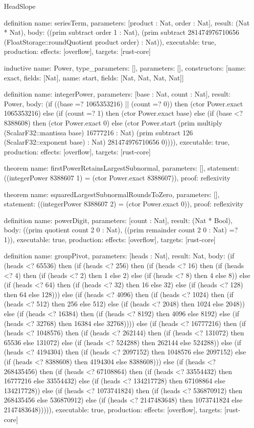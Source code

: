 \begin{lexlean}{HeadSlope}
\begin{semanticmodule}
definition{
  name: seriesTerm,
  parameters: [product : Nat, order : Nat],
  result: (Nat * Nat),
  body: ((prim subtract order 1 : Nat), (prim subtract 281474976710656 (FloatStorage::roundQuotient product order) : Nat)),
  executable: true,
  production: {effects: [overflow], targets: [rust-core]}
}

inductive{
  name: Power,
  type_parameters: [],
  parameters: [],
  constructors: [{name: exact, fields: [Nat]}, {name: start, fields: [Nat, Nat, Nat, Nat]}]
}

definition{
  name: integerPower,
  parameters: [base : Nat, count : Nat],
  result: Power,
  body: (if ((base =? 1065353216) || (count =? 0)) then (ctor Power.exact 1065353216) else (if (count =? 1) then (ctor Power.exact base) else (if (base <? 8388608) then (ctor Power.exact 0) else (ctor Power.start (prim multiply (ScalarF32::mantissa base) 16777216 : Nat) (prim subtract 126 (ScalarF32::exponent base) : Nat) 281474976710656 0)))),
  executable: true,
  production: {effects: [overflow], targets: [rust-core]}
}

theorem{
  name: firstPowerRetainsLargestSubnormal,
  parameters: [],
  statement: ((integerPower 8388607 1) = (ctor Power.exact 8388607)),
  proof: reflexivity{}
}

theorem{
  name: squaredLargestSubnormalRoundsToZero,
  parameters: [],
  statement: ((integerPower 8388607 2) = (ctor Power.exact 0)),
  proof: reflexivity{}
}

definition{
  name: powerDigit,
  parameters: [count : Nat],
  result: (Nat * Bool),
  body: ((prim quotient count 2 0 : Nat), ((prim remainder count 2 0 : Nat) =? 1)),
  executable: true,
  production: {effects: [overflow], targets: [rust-core]}
}

definition{
  name: groupPivot,
  parameters: [heads : Nat],
  result: Nat,
  body: (if (heads <? 65536) then (if (heads <? 256) then (if (heads <? 16) then (if (heads <? 4) then (if (heads <? 2) then 1 else 2) else (if (heads <? 8) then 4 else 8)) else (if (heads <? 64) then (if (heads <? 32) then 16 else 32) else (if (heads <? 128) then 64 else 128))) else (if (heads <? 4096) then (if (heads <? 1024) then (if (heads <? 512) then 256 else 512) else (if (heads <? 2048) then 1024 else 2048)) else (if (heads <? 16384) then (if (heads <? 8192) then 4096 else 8192) else (if (heads <? 32768) then 16384 else 32768)))) else (if (heads <? 16777216) then (if (heads <? 1048576) then (if (heads <? 262144) then (if (heads <? 131072) then 65536 else 131072) else (if (heads <? 524288) then 262144 else 524288)) else (if (heads <? 4194304) then (if (heads <? 2097152) then 1048576 else 2097152) else (if (heads <? 8388608) then 4194304 else 8388608))) else (if (heads <? 268435456) then (if (heads <? 67108864) then (if (heads <? 33554432) then 16777216 else 33554432) else (if (heads <? 134217728) then 67108864 else 134217728)) else (if (heads <? 1073741824) then (if (heads <? 536870912) then 268435456 else 536870912) else (if (heads <? 2147483648) then 1073741824 else 2147483648))))),
  executable: true,
  production: {effects: [overflow], targets: [rust-core]}
}


\end{semanticmodule}
\end{lexlean}
